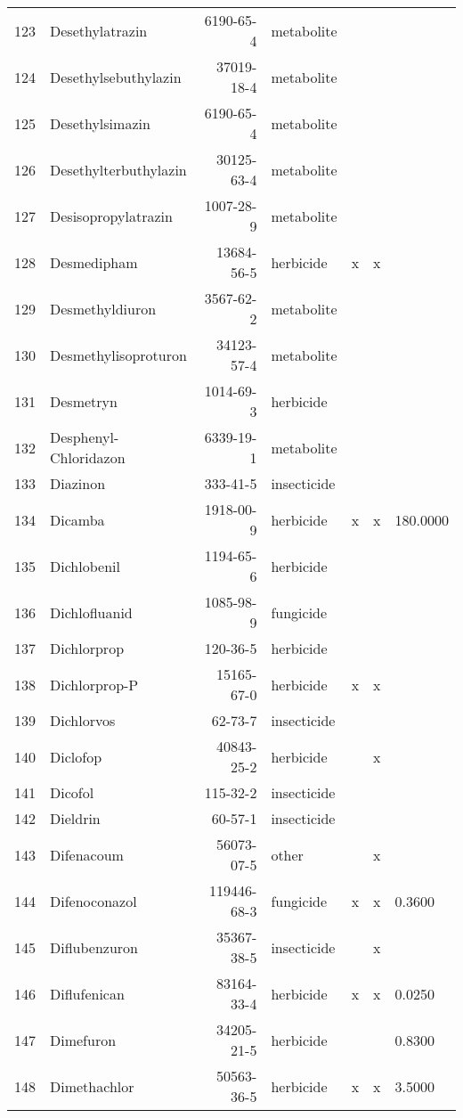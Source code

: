 \begin{longtable}{lp{4cm}rlp{1.3cm}p{1.3cm}p{1.5cm}}
  123 & Desethylatrazin & 6190-65-4 & metabolite &  &  &  \\ 
  124 & Desethylsebuthylazin & 37019-18-4 & metabolite &  &  &  \\ 
  125 & Desethylsimazin & 6190-65-4 & metabolite &  &  &  \\ 
  126 & Desethylterbuthylazin & 30125-63-4 & metabolite &  &  &  \\ 
  127 & Desisopropylatrazin & 1007-28-9 & metabolite &  &  &  \\ 
  128 & Desmedipham & 13684-56-5 & herbicide & x & x &  \\ 
  129 & Desmethyldiuron & 3567-62-2 & metabolite &  &  &  \\ 
  130 & Desmethylisoproturon & 34123-57-4 & metabolite &  &  &  \\ 
  131 & Desmetryn & 1014-69-3 & herbicide &  &  &  \\ 
  132 & Desphenyl-Chloridazon & 6339-19-1 & metabolite &  &  &  \\ 
  133 & Diazinon & 333-41-5 & insecticide &  &  &  \\ 
  134 & Dicamba & 1918-00-9 & herbicide & x & x & 180.0000 \\ 
  135 & Dichlobenil & 1194-65-6 & herbicide &  &  &  \\ 
  136 & Dichlofluanid & 1085-98-9 & fungicide &  &  &  \\ 
  137 & Dichlorprop & 120-36-5 & herbicide &  &  &  \\ 
  138 & Dichlorprop-P & 15165-67-0 & herbicide & x & x &  \\ 
  139 & Dichlorvos & 62-73-7 & insecticide &  &  &  \\ 
  140 & Diclofop & 40843-25-2 & herbicide &  & x &  \\ 
  141 & Dicofol & 115-32-2 & insecticide &  &  &  \\ 
  142 & Dieldrin & 60-57-1 & insecticide &  &  &  \\ 
  143 & Difenacoum & 56073-07-5 & other &  & x &  \\ 
  144 & Difenoconazol & 119446-68-3 & fungicide & x & x & 0.3600 \\ 
  145 & Diflubenzuron & 35367-38-5 & insecticide &  & x &  \\ 
  146 & Diflufenican & 83164-33-4 & herbicide & x & x & 0.0250 \\ 
  147 & Dimefuron & 34205-21-5 & herbicide &  &  & 0.8300 \\ 
  148 & Dimethachlor & 50563-36-5 & herbicide & x & x & 3.5000 \\ 

\end{longtable}

